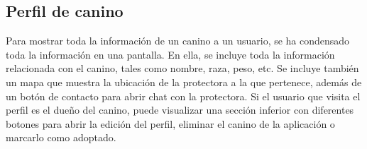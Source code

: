 \documentclass[a4paper, 12pt]{article}
\begin{document}
\newpage
\subsection*{Perfil de canino}

Para mostrar toda la información de un canino a un usuario, se ha condensado toda la información en una pantalla. En ella, se incluye toda la información relacionada con el canino, tales como nombre, raza, peso, etc. Se incluye también un mapa que muestra la ubicación de la protectora a la que pertenece, además de un botón de contacto para abrir chat con la protectora. Si el usuario que visita el perfil es el dueño del canino, puede visualizar una sección inferior con diferentes botones para abrir la edición del perfil, eliminar el canino de la aplicación o marcarlo como adoptado. 
\end{document}
